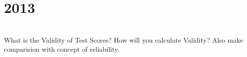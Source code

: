 \section*{2013}
\vspace{-.5cm}
\hrulefill \smallskip\\
 What is the Validity of Test Scores? How will you calculate Validity? Also make comparision with concept of reliability.
